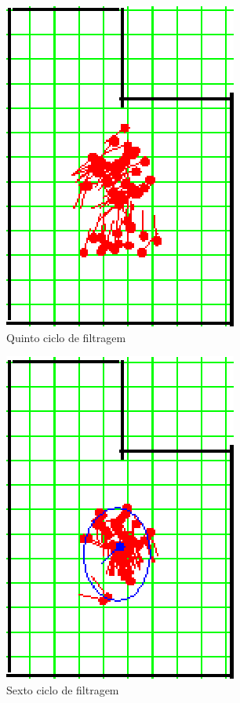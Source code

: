 \begin{figure}[H]
  \centering
  \includegraphics[scale=1]{figuras/cen3_ex2/6.eps}
  \caption[Quinto Ciclo de Filtragem]{Quinto ciclo de filtragem}
  \label{img:cen3_ex2_6}
\end{figure}

\begin{figure}[H]
  \centering
  \includegraphics[scale=1]{figuras/cen3_ex2/7.eps}
  \caption[Sexto Ciclo de Filtragem]{Sexto ciclo de filtragem}
  \label{img:cen3_ex2_7}
\end{figure}


